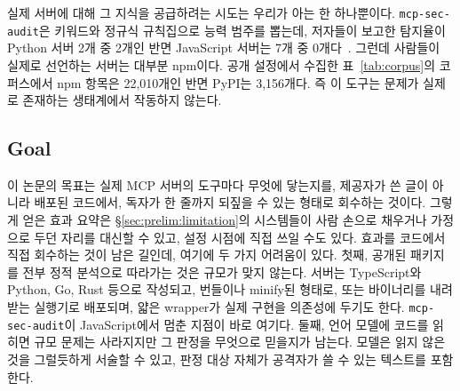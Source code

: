 \documentclass[acmsmall,screen,review,anonymous]{acmart}
\begin{document}
실제 서버에 대해 그 지식을 공급하려는 시도는 우리가 아는 한 하나뿐이다. \texttt{mcp-sec-audit}은 키워드와 정규식 규칙집으로 능력 범주를 뽑는데, 저자들이 보고한 탐지율이 Python 서버 2개 중 2개인 반면 JavaScript 서버는 7개 중 0개다~\cite{huang2026auditing}. 그런데 사람들이 실제로 선언하는 서버는 대부분 npm이다. 공개 설정에서 수집한 표~\ref{tab:corpus}의 코퍼스에서 npm 항목은 22,010개인 반면 PyPI는 3,156개다. 즉 이 도구는 문제가 실제로 존재하는 생태계에서 작동하지 않는다.

\subsection{Goal}
\label{sec:prelim:goal}

이 논문의 목표는 실제 MCP 서버의 도구마다 무엇에 닿는지를, 제공자가 쓴 글이 아니라 배포된 코드에서, 독자가 한 줄까지 되짚을 수 있는 형태로 회수하는 것이다. 그렇게 얻은 효과 요약은 \S\ref{sec:prelim:limitation}의 시스템들이 사람 손으로 채우거나 가정으로 두던 자리를 대신할 수 있고, 설정 시점에 직접 쓰일 수도 있다. 효과를 코드에서 직접 회수하는 것이 남은 길인데, 여기에 두 가지 어려움이 있다. 첫째, 공개된 패키지를 전부 정적 분석으로 따라가는 것은 규모가 맞지 않는다. 서버는 TypeScript와 Python, Go, Rust 등으로 작성되고, 번들이나 minify된 형태로, 또는 바이너리를 내려받는 실행기로 배포되며, 얇은 wrapper가 실제 구현을 의존성에 두기도 한다. \texttt{mcp-sec-audit}이 JavaScript에서 멈춘 지점이 바로 여기다. 둘째, 언어 모델에 코드를 읽히면 규모 문제는 사라지지만 그 판정을 무엇으로 믿을지가 남는다. 모델은 읽지 않은 것을 그럴듯하게 서술할 수 있고, 판정 대상 자체가 공격자가 쓸 수 있는 텍스트를 포함한다.
\end{document}
